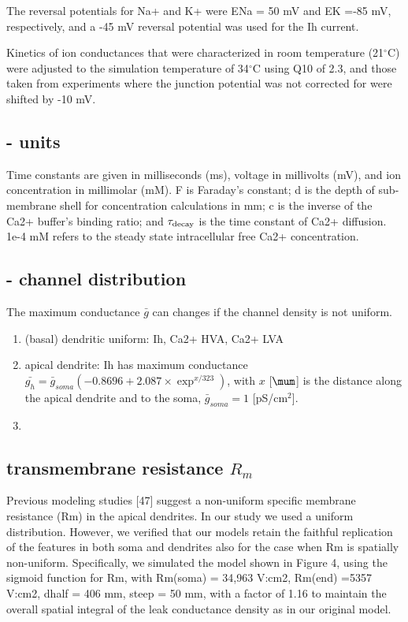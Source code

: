 The reversal potentials for Na+
and K+ were ENa = 50 mV and EK =-85 mV, respectively, and a
-45 mV reversal potential was used for the Ih current.

Kinetics of ion conductances that were characterized in room temperature
(21$^\circ$C) were adjusted to the simulation temperature of 34$^\circ$C using Q10 of
2.3, and those taken from experiments where the junction potential was not corrected
for were shifted by -10 mV.

\subsection{- units}

Time constants are given in milliseconds (ms), voltage in millivolts (mV), and
ion concentration in millimolar (mM). F is Faraday's constant; d is the
depth of sub-membrane shell for concentration calculations in mm; c is the
inverse of the Ca2+ buffer's binding ratio; and $\tau_{\text{decay}}$ is the
time constant of Ca2+ diffusion. 1e-4 mM refers to the steady state
intracellular free Ca2+ concentration.

\subsection{- channel distribution}

The maximum conductance $\bar{g}$ can changes if the channel density is not
uniform.
\begin{enumerate}
  \item (basal) dendritic uniform: Ih, Ca2+ HVA, Ca2+ LVA
  
  \item apical dendrite: Ih has maximum conductance $\bar{g_{h}} =
  \bar{g}_{soma} (-0.8696 + 2.087 \times \exp^{x/323})$, with $x$ [$\mum$] is
  the distance along the apical dendrite and to the soma, $\bar{g}_{soma} = 1$
  [pS/cm$^2$].
  
  \item 
\end{enumerate}

\subsection{transmembrane resistance $R_m$}

Previous modeling studies [47] suggest a non-uniform specific membrane
resistance (Rm) in the apical dendrites. In our study we used a uniform
distribution. However, we verified that our models retain the faithful
replication of the features in both soma and dendrites also for the case when Rm
is spatially non-uniform.
Specifically, we simulated the model shown in Figure 4, using the sigmoid
function for Rm, with Rm(soma) = 34,963 V:cm2, Rm(end) =5357 V:cm2, dhalf = 406
mm, steep = 50 mm, with a factor of 1.16 to maintain the overall spatial
integral of the leak conductance density as in our original model.

